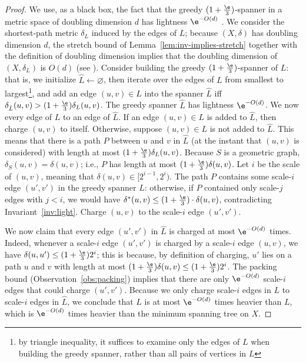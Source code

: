 \documentclass[11pt]{article}
\newcommand{\dist}{\ensuremath{\delta}}
\newcommand{\ddim}{\ensuremath{d}}
\begin{document}
\begin{proof}
    We use, as a black box, the fact that the greedy $(1+\frac \e 3)$-spanner in a metric space of doubling dimension $d$ has lightness $\e^{-O(d)}$ \cite{BLW19}. We consider the shortest-path metric $\dist_L$ induced by the edges of $L$; because $(X, \dist)$ has doubling dimension $\ddim$, the stretch bound of Lemma~\ref{lem:inv-implies-stretch} together with the definition of doubling dimension implies that the doubling dimension of $(X, \dist_L)$ is $O(\ddim)$ (see \cite[Observation 7]{FS20}).
    Consider building the greedy $(1+ \frac \e 3)$-spanner  of $L$: that is, we initialize $\hat L \gets \varnothing$, then iterate over the edges of $L$ from smallest to largest\footnote{by triangle inequality, it suffices to examine only the edges of $L$ when building the greedy spanner, rather than all pairs of vertices in $L$}, and add an edge $(u,v) \in L$ into the spanner $\hat L$ iff $\dist_{\hat L}(u,v) > (1+ \frac \e 3) \dist_L(u,v)$. 
    The greedy spanner $\hat L$ has lightness $\e^{-O(\ddim)}$.
    We now  every edge of $L$ to an edge of $\hat L$. If an edge $(u,v) \in L$ is added to $\hat L$, then charge $(u,v)$ to itself. 
    Otherwise, suppose $(u,v) \in L$ is not added to $\hat L$. This means that there is a path $P$ between $u$ and $v$ in $\hat L$ (at the instant that $(u,v)$ is considered) with length at most $(1+ \frac \e 3) \dist_L(u,v)$. 
    Because $S$ is a geometric graph, $\dist_S(u,v) = \dist(u,v)$; i.e., $P$ has length at most $(1+ \frac \e 3)\dist(u,v)$. Let $i$ be the scale of $(u,v)$, meaning that $\dist(u,v) \in [2^{i-1}, 2^i)$. 
    The path $P$ contains some scale-$i$ edge $(u',v')$ in the greedy spanner $\hat L$: otherwise, if $P$ contained only scale-$j$ edges with $j < i$, we would have $\dist^*(u,v) \le (1+ \frac \e 3) \cdot \dist(u,v)$, contradicting Invariant~\ref{inv:light}. Charge $(u,v)$ to the scale-$i$ edge $(u',v')$.
    
    We now claim that every edge $(u',v')$ in $\hat L$ is charged at most $\e^{-O(\ddim)}$ times. Indeed, whenever a scale-$i$ edge $(u',v')$ is charged by a scale-$i$ edge $(u,v)$, we have $\dist(u,u') \le (1+\frac \e 3) 2^i$; this is because, by definition of charging, $u'$ lies on a path $u$ and $v$ with length at most $(1+ \frac \e 3) \dist(u,v) \le (1+ \frac \e 3) 2^i$. The packing bound (Observation~\ref{obs:packing}) implies that there are only $\e^{-O(\ddim)}$ scale-$i$ edges that could charge $(u',v')$. Because we only charge scale-$i$ edges in $L$ to scale-$i$ edges in $\hat L$, we conclude that $L$ is at most $\e^{-O(\ddim)}$ times heavier than $L$, which is $\e^{-O(\ddim)}$ times heavier than the minimum spanning tree on $X$.
\end{proof}
\end{document}
